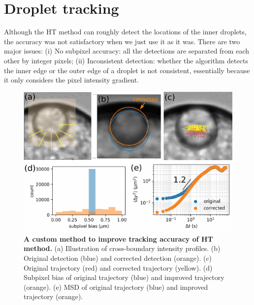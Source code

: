\documentclass[%
10pt,
superscriptaddress,
twocolumn,
 amsmath,amssymb,
 aps,prx,
]{revtex4-2}
\begin{document}
\section{Droplet tracking}

Although the HT method can roughly detect the locations of the inner droplets, the accuracy was not satisfactory when we just use it as it was. 
There are two major issues: 
(i) No subpixel accuracy: all the detections are separated from each other by integer pixels; (ii) Inconsistent detection: whether the algorithm detects the inner edge or the outer edge of a droplet is not consistent, essentially because it only considers the pixel intensity gradient.

\begin{figure}[!t]
  \includegraphics[width=\columnwidth]{hc-correction}
  \caption{
  \textbf{A custom method to improve tracking accuracy of HT method.}
  (a) Illustration of cross-boundary intensity profiles.
  (b) Original detection (blue) and corrected detection (orange).
  (c) Original trajectory (red) and corrected trajectory (yellow).
  (d) Subpixel bias of original trajectory (blue) and improved trajectory (orange).
  (e) MSD of original trajectory (blue) and improved trajectory (orange).
  }
  \label{fig:hc-correction}
\end{figure}
\end{document}
